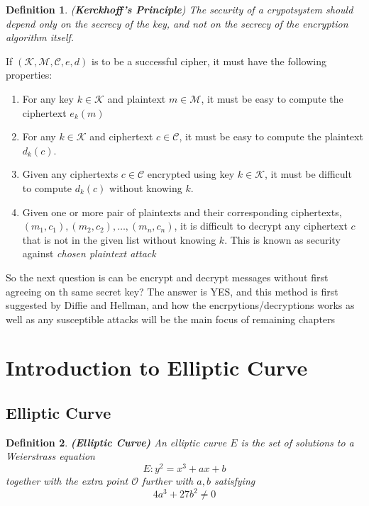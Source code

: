 \documentclass[a4 paper]{article}
\newcommand{\?}{\stackrel{?}{=}}
\newtheorem{definition}{Definition}[section]
\begin{document}
\begin{Definition}
\begin{definition}
(\textbf{Kerckhoff's Principle}) The security of a crypotsystem should depend only on the secrecy of the key, and not on the secrecy of the encryption algorithm itself. 
\end{definition}
\end{Definition}
If $ (\mathcal{K}, \mathcal{M}, \mathcal{C}, e, d ) $ is to be a successful cipher, it must have the following properties: 
\begin{enumerate}
    \item For any key $ k\in \mathcal{K} $ and plaintext $ m \in \mathcal{M} $, it must be easy to compute the ciphertext $ e_k(m) $ 
    \item For any $ k \in \mathcal{K} $ and ciphertext $ c \in \mathcal{C} $, it must be easy to compute the plaintext $ d_k(c) $. 
    \item Given any ciphertexts $ c\in \mathcal{C} $ encrypted using key $ k\in \mathcal{K} $, it must be difficult to compute $ d_k(c) $ without knowing $ k $. 
    \item Given one or more pair of plaintexts and their corresponding ciphertexts, $ (m_1 , c_1 ) , ( m_2 , c_2 ) , \dots, (m_n, c_n) $, it is difficult to decrypt any ciphertext $ c $ that is not in the given list without knowing $ k $. This is known as security against \textit{chosen plaintext attack} 
\end{enumerate}

So the next question is can be encrypt and decrypt messages without first agreeing on th same secret key? The answer is YES, and this method is first suggested by Diffie and Hellman, and how the encrpytions/decryptions works as well as any susceptible attacks will be the main focus of remaining chapters

\section{Introduction to Elliptic Curve}
\subsection{Elliptic Curve}
\begin{Definition}
\begin{definition}
\textbf{(Elliptic Curve)} An elliptic curve $ E $ is the set of solutions to a Weierstrass equation 
$$  E : y^2 = x^3 + a x +b  $$
together with the extra point $ \mathcal{O} $ further with $ a,b $ satisfying 
$$ 4a^3 + 27b^2 \neq 0  $$

\end{definition}
\end{Definition}
\end{document}

